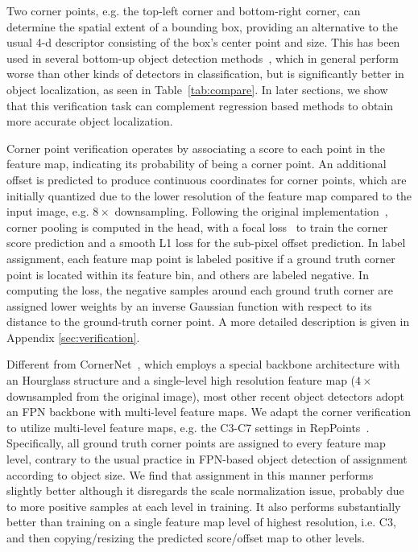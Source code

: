 \documentclass{article}
\begin{document}
Two corner points, e.g. the top-left corner and bottom-right corner, can determine the spatial extent of a bounding box, providing an alternative to the usual 4-d descriptor consisting of the box's center point and size. This has been used in several bottom-up object detection methods~\cite{CornerNet, ExtremeNet, Denet}, which in general perform worse than other kinds of detectors in classification, but is significantly better in object localization, as seen in Table~\ref{tab:compare}. In later sections, we show that this verification task can complement regression based methods to obtain more accurate object localization.

Corner point verification operates by associating a score to each point in the feature map, indicating its probability of being a corner point. An additional offset is predicted to produce continuous coordinates for corner points, which are initially quantized due to the lower resolution of the feature map compared to the input image, e.g. $8\times$ downsampling. Following the original implementation~\cite{CornerNet}, corner pooling is computed in the head, with a focal loss~\cite{RetinaNet} to train the corner score prediction and a smooth L1 loss for the sub-pixel offset prediction. In label assignment, each feature map point is labeled positive if a ground truth corner point is located within its feature bin, and others are labeled negative. In computing the loss, the negative samples around each ground truth corner are assigned lower weights by an inverse Gaussian function with respect to its distance to the ground-truth corner point. A more detailed description is given in Appendix \ref{sec:verification}.

Different from CornerNet~\cite{CornerNet}, which employs a special backbone architecture with an Hourglass structure and a single-level high resolution feature map ($4\times$ downsampled from the original image), most other recent object detectors adopt an FPN backbone with multi-level feature maps. We adapt the corner verification to utilize multi-level feature maps, e.g. the C3-C7 settings in RepPoints~\cite{yang19reppts}. Specifically, all ground truth corner points are assigned to every feature map level, contrary to the usual practice in FPN-based object detection of assignment according to object size. We find that assignment in this manner performs slightly better although it disregards the scale normalization issue, probably due to more positive samples at each level in training. It also performs substantially better than training on a single feature map level of highest resolution, i.e. C3, and then copying/resizing the predicted score/offset map to other levels.
\end{document}

